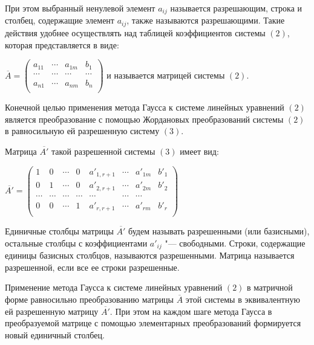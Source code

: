 \documentclass[bachelor, och, labwork]{shiza}
\begin{document}
        При этом выбранный ненулевой элемент $a_{ij}$ называется разрешающим,
        строка и столбец, содержащие элемент $a_{ij}$, также называются
        разрешающими. Такие действия удобнее осуществлять над таблицей
        коэффициентов системы $(2)$, которая представляется в виде:

        $ \overline{A} =
        \begin{pmatrix}
            a_{11} & \cdots & a_{1m} & b_1 \\
            \cdots & \cdots & \cdots & \cdots \\
            a_{n1} & \cdots & a_{nm} & b_n \\
        \end{pmatrix}
        $ и называется матрицей системы $(2)$.

        Конечной целью применения метода Гаусса к системе линейных уравнений
        $(2)$ является преобразование с помощью Жордановых преобразований
        системы $(2)$ в равносильную ей разрешенную систему $(3)$.

        Матрица $\overline{A'}$ такой разрешенной системы $(3)$ имеет вид:

        $ \overline{A'} =
        \begin{pmatrix}
            1 & 0 & \cdots & 0 & a'_{1,r+1} & \cdots & a'_{1m} & b'_1 \\
            0 & 1 & \cdots & 0 & a'_{2,r+1} & \cdots & a'_{2m} & b'_2 \\
            \cdots & \cdots & \cdots & \cdots & \cdots & \cdots & \cdots \\
            0 & 0 & \cdots & 1 & a'_{r,r+1} & \cdots & a'_{rm} & b'_r \\
        \end{pmatrix}
        $

        Единичные столбцы матрицы $\overline{A'}$ будем называть разрешенными
        (или базисными), остальные столбцы с коэффициентами $a'_{ij}$ "---
        свободными. Строки, содержащие единицы базисных столбцов, называются
        разрешенными. Матрица называется разрешенной, если все ее строки
        разрешенные.

        Применение метода Гаусса к системе линейных уравнений $(2)$ в матричной
        форме равносильно преобразованию матрицы $\overline{A}$ этой системы в
        эквивалентную ей разрешенную матрицу $\overline{A'}$. При этом на каждом
        шаге метода Гаусса в преобразуемой матрице с помощью элементарных
        преобразований формируется новый единичный столбец.
\end{document}
